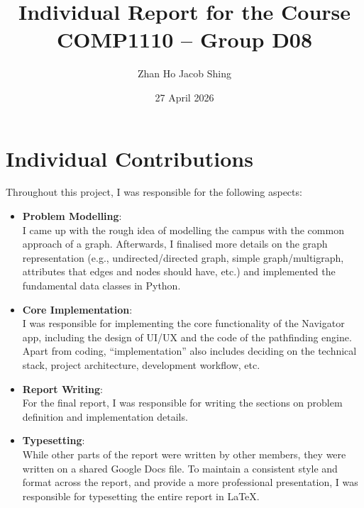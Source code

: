 \documentclass[a4paper,10pt]{amsart}
\begin{document}
\title[Individual Report]{Individual Report for the Course COMP1110 -- Group D08}
\newcommand{\jShing}{J. Shing}
\author[\jShing]{Zhan Ho Jacob Shing}
\address{\jShing, BEng(CompSc), 3036228892, \href{mailto:jacobszh@connect.hku.hk}{\texttt{jacobszh@connect.hku.hk}}}
\date{27 April 2026}
\maketitle




\section{Individual Contributions}

Throughout this project, I was responsible for the following aspects:
\begin{itemize}
    \item \textbf{Problem Modelling}:\\
        I came up with the rough idea of modelling the campus with the common approach of a graph.
        Afterwards, I finalised more details on the graph representation (e.g., undirected/directed graph, simple graph/multigraph, attributes that edges and nodes should have, etc.) and implemented the fundamental data classes in Python.
    \item \textbf{Core Implementation}:\\
        I was responsible for implementing the core functionality of the Navigator app, including the design of UI/UX and the code of the pathfinding engine.
        Apart from coding, ``implementation'' also includes deciding on the technical stack, project architecture, development workflow, etc.
    \item \textbf{Report Writing}:\\
        For the final report, I was responsible for writing the sections on problem definition and implementation details.
    \item \textbf{Typesetting}:\\
        While other parts of the report were written by other members, they were written on a shared Google Docs file.
        To maintain a consistent style and format across the report, and provide a more professional presentation, I was responsible for typesetting the entire report in \LaTeX.
\end{itemize}
\end{document}
